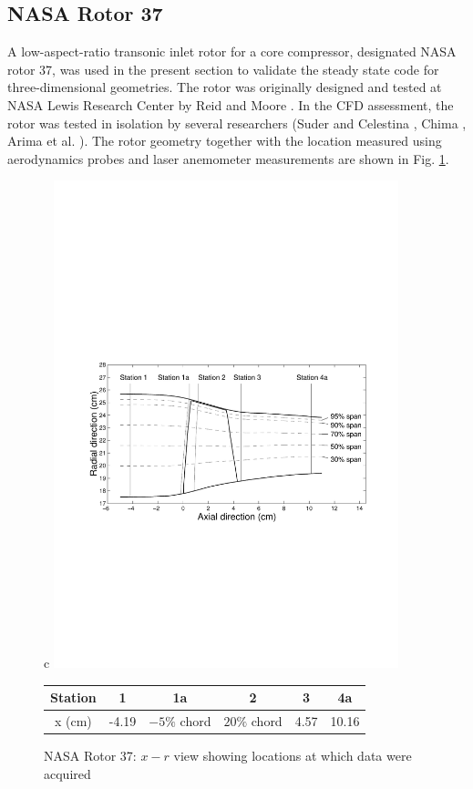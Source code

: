 %
%
\subsection{NASA Rotor 37}
\label{nasa_rotor37.subsec}
%
 A low-aspect-ratio transonic inlet rotor for a core compressor,
 designated NASA rotor 37, was used in the present section to validate
 the steady state code for three-dimensional geometries.
 The rotor was originally designed and tested at NASA Lewis Research
 Center by Reid and Moore \citeyear{Reid:1}.
 In the CFD assessment, the rotor was tested in isolation by several
 researchers (Suder and Celestina ,
 Chima , Arima et al. ).
 The rotor geometry together with the location measured using
 aerodynamics probes and laser anemometer measurements
 are shown in Fig. \ref{rot37_geo.fig}.
%
\begin{figure}
  \begin{center}
   \begin{tabular}{c}
    \subfigure
      {\includegraphics[width=100mm,clip=t]{CHAP_NONLIN/FIGURE/rotgeo.pdf}}
      \vspace{-4mm}\\
    \subfigure
      {\begin{tabular}{|c|c|c|c|c|c|}\hline
        Station & 1 & 1a & 2 & 3 & 4a \\ \hline
        x (cm) & -4.19 & $-5\%$ chord & $20\%$ chord & 4.57 & 10.16 \\ \hline
      \end{tabular}}
   \end{tabular}
  \end{center}
  \vspace{-8mm}
  \caption{NASA Rotor 37: $x-r$ view showing locations at which data were
           acquired}
  \label{rot37_geo.fig}
\end{figure}
%

